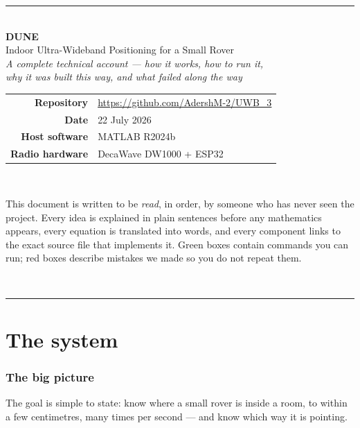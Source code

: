 \documentclass[11pt,a4paper]{article}
\begin{document}
\begin{titlepage}
\centering
{\color{dune}\rule{\textwidth}{2pt}}\\[14mm]
{\Huge\bfseries\color{dune} DUNE\\[3mm]}
{\LARGE Indoor Ultra-Wideband Positioning for a Small Rover\\[10mm]}
{\large\itshape A complete technical account --- how it works, how to run it,\\
 why it was built this way, and what failed along the way\\[16mm]}
\begin{tabular}{rl}
\textbf{Repository} & \url{https://github.com/AdershM-2/UWB_3}\\[1mm]
\textbf{Date} & 22 July 2026\\[1mm]
\textbf{Host software} & MATLAB R2024b\\[1mm]
\textbf{Radio hardware} & DecaWave DW1000 + ESP32\\
\end{tabular}\\[16mm]
\begin{minipage}{0.86\textwidth}
\small
This document is written to be \emph{read}, in order, by someone who has never seen
the project. Every idea is explained in plain sentences before any mathematics
appears, every equation is translated into words, and every component links to the
exact source file that implements it. Green boxes contain commands you can run;
red boxes describe mistakes we made so you do not repeat them.
\end{minipage}\\[10mm]
{\color{dune}\rule{\textwidth}{2pt}}
\end{titlepage}

\tableofcontents
\newpage

\part{The system}

\section{The big picture}
\label{sec:bigpicture}

The goal is simple to state: know where a small rover is inside a room, to within a
few centimetres, many times per second --- and know which way it is pointing.
\end{document}
